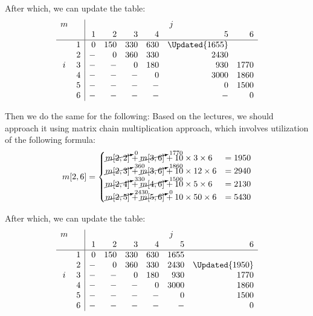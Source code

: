 After which, we can update the table:
\[
\begin{array}{cc|rrrrrr}
m &   & \multicolumn{6}{c}{j}                          \\
  &   &  1   &  2  &  3  &  4  &       5        &   6  \\
\hline
  & 1 &  0   & 150 & 330 & 630 & \Updated{1655} &      \\
  & 2 &  -   &  0  & 360 & 330 &     2430       &      \\
i & 3 &  -   &  -  &  0  & 180 &      930       & 1770 \\
  & 4 &  -   &  -  &  -  &  0  &     3000       & 1860 \\
  & 5 &  -   &  -  &  -  &  -  &       0        & 1500 \\
  & 6 &  -   &  -  &  -  &  -  &       -        &   0
\end{array}
\]

Then we do the same for the following:
Based on the lectures, we should approach it using matrix chain multiplication
approach, which involves utilization of the following formula:
$$
    m[2, 6] =
    \begin{cases}
        \cancelto{0}{m[2, 2]}    + \cancelto{1770}{m[3, 6]} + 10 \times  3 \times 6  & = 1950 \\
        \cancelto{360}{m[2, 3]}  + \cancelto{1860}{m[3, 6]} + 10 \times 12 \times 6  & = 2940 \\
        \cancelto{330}{m[2, 4]}  + \cancelto{1500}{m[4, 6]} + 10 \times  5 \times 6  & = 2130 \\
        \cancelto{2430}{m[2, 5]} + \cancelto{0}{m[5, 6]}    + 10 \times 50 \times 6  & = 5430
    \end{cases}
$$

After which, we can update the table:
\[
\begin{array}{cc|rrrrrr}
m &   & \multicolumn{6}{c}{j}                          \\
  &   &  1   &  2  &  3  &  4  &   5  &       6        \\
\hline
  & 1 &  0   & 150 & 330 & 630 & 1655 &                \\
  & 2 &  -   &  0  & 360 & 330 & 2430 & \Updated{1950} \\
i & 3 &  -   &  -  &  0  & 180 &  930 &      1770      \\
  & 4 &  -   &  -  &  -  &  0  & 3000 &      1860      \\
  & 5 &  -   &  -  &  -  &  -  &   0  &      1500      \\
  & 6 &  -   &  -  &  -  &  -  &   -  &        0
\end{array}
\]

